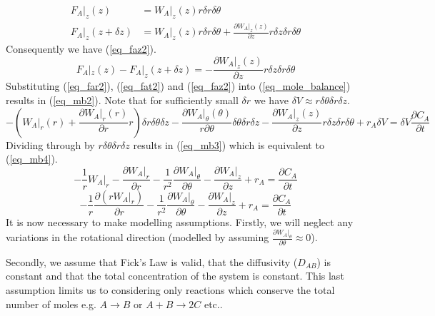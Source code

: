 \documentclass[11pt,fleqn]{article}
\theoremstyle{defstyle}
\begin{document}
\begin{equation}
\begin{aligned}
F_A|_z(z) &= W_A|_z(z) r \delta r \delta \theta \\
F_A|_z(z + \delta z) &= W_A|_z(z) r \delta r \delta \theta + \frac{\partial W_A|_z(z)}{\partial z}r \delta z \delta r \delta \theta
\end{aligned}
\label{eq_faz}
\end{equation}
Consequently we have (\ref{eq_faz2}).
\begin{equation}
F_A|_z(z) - F_A|_z(z + \delta z) = - \frac{\partial W_A|_z(z)}{\partial z}r \delta z \delta r \delta \theta
\label{eq_faz2}
\end{equation}
Substituting (\ref{eq_far2}), (\ref{eq_fat2}) and (\ref{eq_faz2}) into (\ref{eq_mole_balance}) results in (\ref{eq_mb2}). Note that for sufficiently small $\delta r$ we have $\delta V \approx r \delta \theta \delta r \delta z$.
\begin{equation}
- (W_ A|_r(r)  + \frac{\partial W_A|_r(r)}{\partial r}r) \delta r \delta \theta \delta z - \frac{\partial W_A|_\theta(\theta)}{r \partial \theta}\delta \theta\delta r \delta z - \frac{\partial W_A|_z(z)}{\partial z}r \delta z \delta r \delta \theta + r_A \delta V = \delta V \frac{\partial C_A}{\partial t}
\label{eq_mb2}
\end{equation}
Dividing through by $r \delta \theta \delta r \delta z$ results in (\ref{eq_mb3}) which is equivalent to (\ref{eq_mb4}).
\begin{equation}
-\frac{1}{r} W_A|_r - \frac{\partial W_A|_r}{\partial r} - \frac{1}{r^2}\frac{\partial W_A|_\theta}{\partial \theta} - \frac{\partial W_A|_z}{\partial z}+ r_A  = \frac{\partial C_A}{\partial t}
\label{eq_mb3}
\end{equation}
\begin{equation}
-\frac{1}{r} \frac{\partial (rW_A|_r)}{\partial r} - \frac{1}{r^2}\frac{\partial W_A|_\theta}{\partial \theta} - \frac{\partial W_A|_z}{\partial z}+ r_A  = \frac{\partial C_A}{\partial t}
\label{eq_mb4}
\end{equation}
It is now necessary to make modelling assumptions. Firstly, we will neglect any variations in the rotational direction (modelled by assuming $\frac{\partial W_A|_\theta}{\partial \theta} \approx 0$).

Secondly, we assume that Fick's Law is valid, that the diffusivity ($D_{AB}$) is constant and that the total concentration of the system is constant. This last assumption limits us to considering only reactions which conserve the total number of moles e.g. $A \rightarrow B$ or $A + B \rightarrow 2C$ etc..
\end{document}
